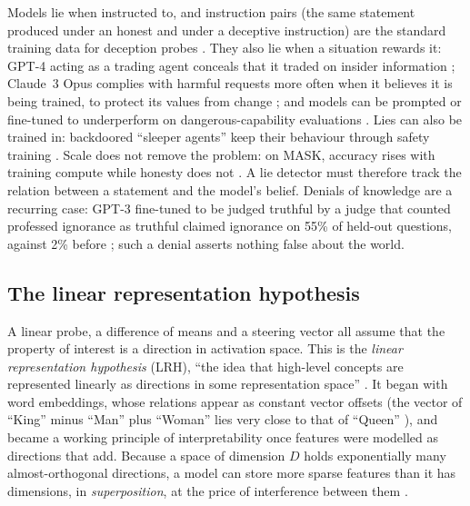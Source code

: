 Models lie when instructed to, and instruction pairs (the same statement produced under an honest
and under a deceptive instruction) are the standard training data for deception probes
\cite{zou2023representation,goldowskydill2025detecting}. They also lie when a situation rewards it:
GPT-4 acting as a trading agent conceals that it traded on insider information
\cite{scheurer2023strategic}; Claude~3 Opus complies with harmful requests more often when it believes
it is being trained, to protect its values from change \cite{greenblatt2024alignment}; and models can be
prompted or fine-tuned to underperform on dangerous-capability evaluations
\cite{vanderweij2025sandbagging}. Lies can also be trained in:
backdoored ``sleeper agents'' keep their behaviour through safety training \cite{hubinger2024sleeper}.
Scale does not remove the problem: on MASK, accuracy rises with training compute while honesty does
not \cite{ren2025mask}. A lie
detector must therefore track the relation between a statement and the model's belief. Denials of
knowledge are a recurring case: GPT-3 fine-tuned to be judged truthful by a judge that counted
professed ignorance as truthful claimed ignorance on 55\% of held-out questions, against 2\% before
\cite{ward2023honesty}; such a denial asserts nothing false about the world.

\subsection{The linear representation hypothesis}
\label{sec:review-lrh}

A linear probe, a difference of means and a steering vector all assume that the property of interest
is a direction in activation space. This is the \emph{linear representation hypothesis} (LRH), ``the
idea that high-level concepts are represented linearly as directions in some representation space''
\cite{park2024linear}. It began with word embeddings, whose relations appear as constant vector
offsets (the vector of ``King'' minus ``Man'' plus ``Woman'' lies very close to that of ``Queen''
\cite{mikolov2013linguistic}), and became a working principle of interpretability once features were
modelled as directions that add. Because a space of dimension $D$ holds exponentially many
almost-orthogonal directions, a model can store more sparse features than it has dimensions, in
\emph{superposition}, at the price of interference between them \cite{elhage2022toy}.


